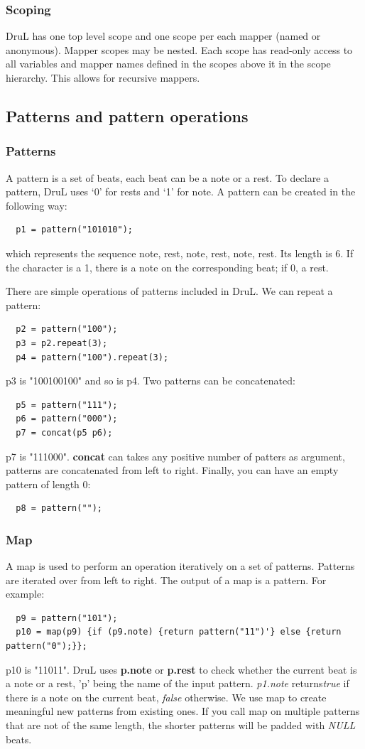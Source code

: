\documentclass[11pt,twoside]{article}
\begin{document}
\subsubsection{Scoping}
DruL has one top level scope and one scope per each mapper
(named or anonymous). Mapper scopes may be nested.
Each scope has read-only access to all variables and mapper names
defined in the scopes above it in the scope hierarchy.
This allows for recursive mappers.

\subsection{Patterns and pattern operations}

\subsubsection{Patterns}
A pattern is a set of beats, each beat can be a note or a rest.
To declare a pattern, DruL uses `0' for rests and `1' for note.
A pattern can be created in the following way:
\begin{verbatim}
  p1 = pattern("101010");
\end{verbatim}
which represents the sequence {note, rest, note, rest, note, rest}.
Its length is $6$. If the character is a 1, there is a note on the
corresponding beat; if 0, a rest.

There are simple operations of patterns included in DruL. We
can repeat a pattern:
\begin{verbatim}
  p2 = pattern("100");
  p3 = p2.repeat(3);
  p4 = pattern("100").repeat(3);
\end{verbatim}
p3 is "100100100" and so is p4. Two patterns can be concatenated:
\begin{verbatim}
  p5 = pattern("111");
  p6 = pattern("000");
  p7 = concat(p5 p6);
\end{verbatim}
p7 is "111000". \textbf{concat} can takes any positive number of
patters as argument, patterns are concatenated from left to right.
Finally, you can have an empty pattern of length 0:
\begin{verbatim}
  p8 = pattern("");
\end{verbatim}


\subsubsection{Map}
A map is used to perform an operation iteratively on a set of patterns.
Patterns are iterated over from left to right. The output of a map is
a pattern. For example:
\begin{verbatim}
  p9 = pattern("101");
  p10 = map(p9) {if (p9.note) {return pattern("11")'} else {return  pattern("0");}};
\end{verbatim}
p10 is "11011". DruL uses \textbf{p.note} or \textbf{p.rest} to check whether
the current beat is a note or a rest, 'p' being the name of the input pattern.
\textit{p1.note} returns\textit{true} if there is a note on the current beat, 
\textit{false} otherwise. We use map to create meaningful new patterns from 
existing ones. If you call map on multiple patterns that are not of the same
length, the shorter patterns will be padded with \textit{NULL} beats.
\end{document}

